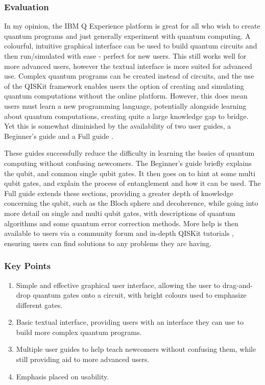 \documentclass[a4paper,10pt, titlepage, twoside]{article}
\begin{document}
\subsubsection{Evaluation}
In my opinion, the IBM Q Experience platform is great for all who wish to create quantum programs and just generally experiment with quantum computing. A colourful, intuitive graphical interface can be used to build quantum circuits and then run/simulated with ease - perfect for new users. This still works well for more advanced users, however the textual interface is more suited for advanced use. Complex quantum programs can be created instead of circuits, and the use of the QISKit framework enables users the option of creating and simulating quantum computations without the online platform. However, this does mean users must learn a new programming language, potentially alongside learning about quantum computations, creating quite a large knowledge gap to bridge. Yet this is somewhat diminished by the availability of two user guides, a Beginner's guide \cite{ibmqbeginner} and a Full guide \cite{ibmqfull}.\par
These guides successfully reduce the difficulty in learning the basics of quantum computing without confusing newcomers. The Beginner's guide briefly explains the qubit, and common single qubit gates. It then goes on to hint at some multi qubit gates, and explain the process of entanglement and how it can be used. The Full guide extends these sections, providing a greater depth of knowledge concerning the qubit, such as the Bloch sphere and decoherence, while going into more detail on single and multi qubit gates, with descriptions of quantum algorithms and some quantum error correction methods. More help is then available to users via a community forum \cite{ibmqforum} and in-depth QISKit tutorials \cite{ibmqiskit}, ensuring users can find solutions to any problems they are having.

\subsubsection{Key Points}
\begin{enumerate}
	\item Simple and effective graphical user interface, allowing the user to drag-and-drop quantum gates onto a circuit, with bright colours used to emphasize different gates.
	\item Basic textual interface, providing users with an interface they can use to build more complex quantum programs.
	\item Multiple user guides to help teach newcomers without confusing them, while still providing aid to more advanced users. 
	\item Emphasis placed on usability.
\end{enumerate}
\end{document}
